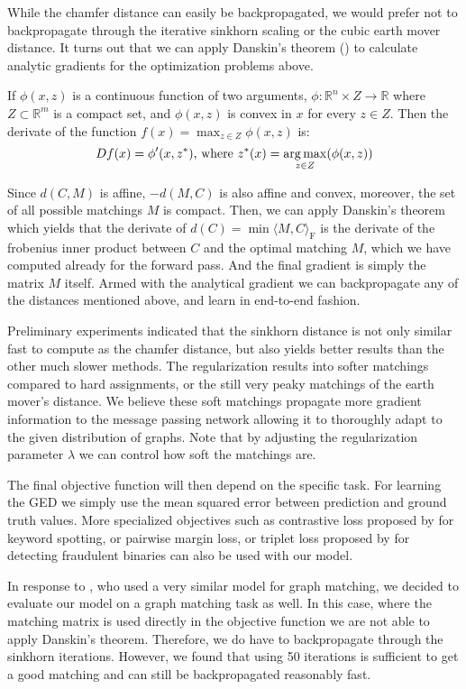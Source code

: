 While the chamfer distance can easily be backpropagated, we would prefer not to backpropagate through the iterative sinkhorn scaling or the cubic earth mover distance. It turns out that we can apply Danskin's theorem (\citealp{danskin1967}) to calculate analytic gradients for the optimization problems above.
\begin{theorem}
     If $\phi(x,z)$ is a continuous function of two arguments, $\phi: {\mathbb R}^n \times Z \rightarrow {\mathbb R}$ where $Z \subset {\mathbb R}^m$ is a compact set, and  $\phi(x,z)$ is convex in $x$ for every $z \in Z$.
     Then the derivate of the function $f(x) = \max_{z \in Z} \phi(x,z)$ is:
     \begin{equation}
          D f(x) = \phi'(x,z^*)  \text{, where } z^*(x) = \operatorname*{arg\,max}_{z \in Z}(\phi(x,z))
     \end{equation}
\end{theorem}
Since $d(C, M)$ is affine, $-d(M,C)$ is also affine and convex, moreover, the set of all possible matchings $M$ is compact. Then, we can apply Danskin's theorem which yields that the derivate of $d(C) = \min \langle M, C \rangle_\mathrm{F}$ is the derivate of the frobenius inner product between $C$ and the optimal matching $M$, which we have computed already for the forward pass. And the final gradient is simply the matrix $M$ itself. Armed with the analytical gradient we can backpropagate any of the distances mentioned above, and learn in end-to-end fashion.

Preliminary experiments indicated that the sinkhorn distance is not only similar fast to compute as the chamfer distance, but also yields better results than the other much slower methods. The regularization results into softer matchings compared to hard assignments, or the still very peaky matchings of the earth mover's distance. We believe these soft matchings propagate more gradient information to the message passing network allowing it to thoroughly adapt to the given distribution of graphs. Note that by adjusting the regularization parameter $\lambda$ we can control how soft the matchings are.

The final objective function will then depend on the specific task. For learning the GED we simply use the mean squared error between prediction and ground truth values. More specialized objectives such as contrastive loss proposed by \cite{riba2018} for keyword spotting, or pairwise margin loss, or triplet loss proposed by \cite{li2019} for detecting fraudulent binaries can also be used with our model.

In response to \cite{fey2020_update}, who used a very similar model for graph matching, we decided to evaluate our model on a graph matching task as well. In this case, where the matching matrix is used directly in the objective function we are not able to apply Danskin's theorem. Therefore, we do have to backpropagate through the sinkhorn iterations. However, we found that using 50 iterations is sufficient to get a good matching and can still be backpropagated reasonably fast.

